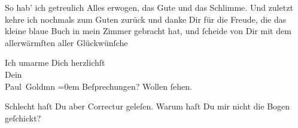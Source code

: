 \pstart
           So hab’ ich getreulich Alles erwogen, das Gute und das Schlimme. Und zuletzt kehre
               ich nochmals zum Guten zurück und danke Dir für die Freude, die das kleine blaue Buch in mein Zimmer gebracht
               hat, und{ }ſcheide von Dir mit dem allerwärmſten aller Glückwünſche{\dotstwo}\pend
           
\pstart
           Ich umarme Dich herzlichſt {\\[\baselineskip]}Dein {\\[\baselineskip]}\spacefill\mbox{Paul Goldmn}\pend
           \leftskip=0em{}
\pstart
           \noindent{}Beſprechungen? Wollen{ }ſehen.\pend
           
\pstart
           Schlecht haſt Du aber Correctur geleſen. Warum haſt Du mir nicht die Bogen
                  geſchickt?\pend
           
\pstart
           \label{T_L02703-1v}\label{T_L02703-1}\pend
           \endnumbering{}  \newcommand{\dateiname}{L02703}\newcommand{\titel}{Paul Goldmann an Arthur Schnitzler, 2. 11. [1892]}\newcommand{\editorInnen}{Martin Anton Müller und Laura Untner}
